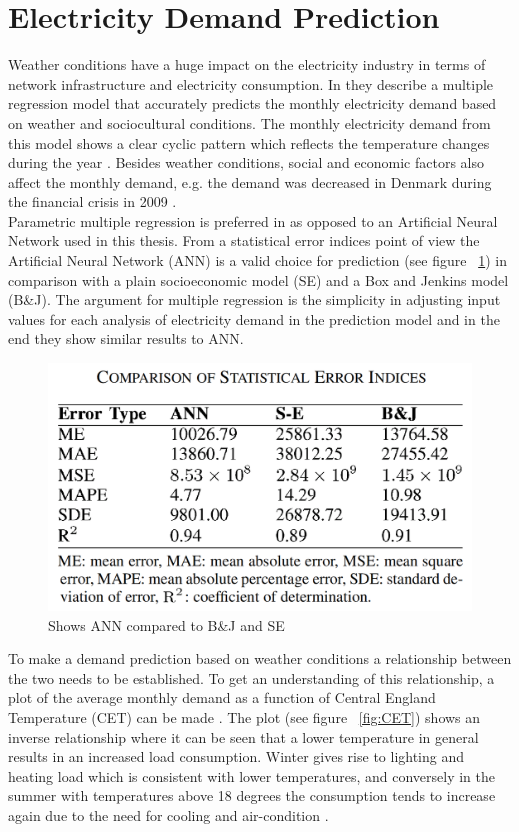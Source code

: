 \documentclass[twoside,11pt,openright]{report}
\begin{document}
\section{Electricity Demand Prediction}
Weather conditions have a huge impact on the electricity industry in terms of network infrastructure and electricity consumption. In \cite{19} they describe a multiple regression model that accurately predicts the monthly electricity demand based on weather and sociocultural conditions. The monthly electricity demand from this model shows a clear cyclic pattern which reflects the temperature changes during the year \cite{19}. Besides weather conditions, social and economic factors also affect the monthly demand, e.g. the demand was decreased in Denmark during the financial crisis in 2009 \cite{20}. 
\\[0.5cm]
Parametric multiple regression is preferred in \cite{19} as opposed to an Artificial Neural Network used in this thesis. From a statistical error indices point of view the Artificial Neural Network (ANN) is a valid choice for prediction (see figure ~\ref{fig:anncomparison}) in comparison with a plain socioeconomic model (SE) and a Box and Jenkins model (B\&J). The argument for multiple regression is the simplicity in adjusting input values for each analysis of electricity demand in the prediction model and in the end they show similar results to ANN. 
\begin{figure}[h!]
\centering
\includegraphics[width=0.8\linewidth,natwidth=898,natheight=587]{billeder/StatisticalErrorOfNeuralNetworksAndRegression.png}
\caption{Shows ANN compared to B\&J and SE \cite{19} }
\label{fig:anncomparison}
\end{figure}
To make a demand prediction based on weather conditions a relationship between the two needs to be established. To get an understanding of this relationship, a plot of the average monthly demand as a function of Central England Temperature (CET) can be made \cite{19}. The plot (see figure ~\ref{fig:CET}) shows an inverse relationship where it can be seen that a lower temperature in general results in an increased load consumption. Winter gives rise to lighting and heating load which is consistent with lower temperatures, and conversely in the summer with temperatures above 18 degrees the consumption tends to increase again due to the need for cooling and air-condition \cite{19}.
\end{document}
